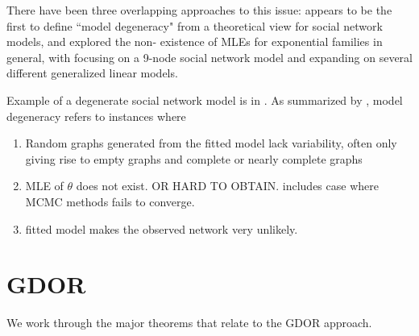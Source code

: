 \documentclass{amsbook}
\theoremstyle{definition}
\theoremstyle{remark}
\begin{document}
There have been three overlapping approaches to this issue: \citet{Handcock:Degeneracy} 
appears to be the first to define ``model degeneracy" from a theoretical view for 
social network models, \citet{Rinaldo:2009} and \citet{Geyer:gdor} explored the non-
existence of MLEs for exponential families in general, with \citet{Rinaldo:2009} 
focusing on a 9-node social network model and \citet{Geyer:gdor} expanding on several 
different generalized linear models.

Example of a degenerate social network model is in \citet{statnet-tutorial}.  As 
summarized by \citet{Rinaldo:2009}, model degeneracy refers to instances where

\begin{enumerate}
\item Random graphs generated from the fitted model lack variability, often only 
giving rise to empty graphs and complete or nearly complete graphs
\item MLE of $\theta$ does not exist.  OR HARD TO OBTAIN.  includes case where MCMC 
methods fails to converge.
\item fitted model makes the observed network very unlikely.
\end{enumerate}

\newpage
\section{GDOR}
We work through the major theorems that relate to the GDOR approach.
\end{document}
